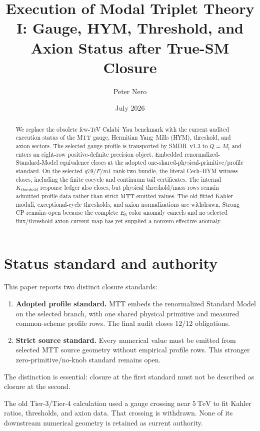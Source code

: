 \documentclass[11pt]{article}
\title{Execution of Modal Triplet Theory I:
Gauge, HYM, Threshold, and Axion Status after True-SM Closure}
\author{Peter Nero}
\date{July 2026}
\begin{document}
\maketitle

\begin{abstract}
We replace the obsolete few-TeV Calabi--Yau benchmark with the current audited
execution status of the MTT gauge, Hermitian Yang--Mills (HYM), threshold, and
axion sectors. The selected gauge profile is transported by SMDR~v1.3 to
$Q=M_t$ and enters an eight-row positive-definite precision object. Embedded
renormalized-Standard-Model equivalence closes at the adopted
one-shared-physical-primitive/profile standard. On the selected
$q79/F/m1$ rank-two bundle, the literal Cech--HYM witness closes, including the
finite cocycle and continuum tail certificates. The internal
$K_{\mathrm{threshold}}$ response ledger also closes, but physical
threshold/mass rows remain admitted profile data rather than strict MTT-emitted
values. The old fitted Kahler moduli, exceptional-cycle thresholds, and axion
normalizations are withdrawn. Strong CP remains open because the complete
$E_6$ color anomaly cancels and no selected flux/threshold axion-current map
has yet supplied a nonzero effective anomaly.
\end{abstract}

\section{Status standard and authority}

This paper reports two distinct closure standards:
\begin{enumerate}
\item \textbf{Adopted profile standard.} MTT embeds the renormalized Standard
Model on the selected branch, with one shared physical primitive and measured
common-scheme profile rows. The final audit closes 12/12 obligations.
\item \textbf{Strict source standard.} Every numerical value must be emitted
from selected MTT source geometry without empirical profile rows. This stronger
zero-primitive/no-knob standard remains open.
\end{enumerate}
The distinction is essential: closure at the first standard must not be
described as closure at the second.

The old Tier-3/Tier-4 calculation used a gauge crossing near $5~\mathrm{TeV}$
to fit Kahler ratios, thresholds, and axion data. That crossing is withdrawn.
None of its downstream numerical geometry is retained as current authority.
\end{document}

